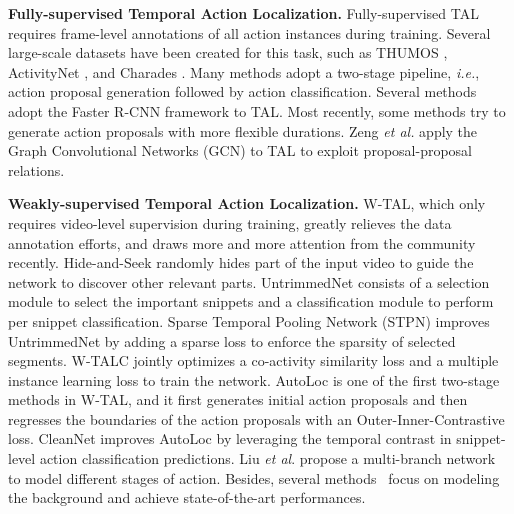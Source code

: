 \documentclass[runningheads]{llncs}
\begin{document}
\noindent\textbf{Fully-supervised Temporal Action Localization.} Fully-supervised TAL requires frame-level annotations of all action instances during training. Several large-scale datasets have been created for this task, such as THUMOS \cite{jiang2014thumos,gorban2015thumos}, ActivityNet \cite{caba2015activitynet}, and Charades \cite{sigurdsson2016hollywood}. 
Many methods \cite{shou2017cdc,zhao2017temporal,gao2017cascaded,heilbron2017scc,dai2017temporal,xu2017r,lin2018bsn,chao2018rethinking} adopt a two-stage pipeline, \emph{i.e.}, action proposal generation followed by action classification. 
Several methods \cite{xu2017r,dai2017temporal,gao2017turn,chao2018rethinking} adopt the Faster R-CNN \cite{ren2015faster} framework to TAL.
Most recently, some methods \cite{lin2018bsn,long2019gaussian,lin2019bmn} try to generate action proposals with more flexible durations. 
Zeng \textit{et al.} \cite{zeng2019graph} apply the Graph Convolutional Networks (GCN) \cite{kipf2016semi,tan2015learning} to TAL to exploit proposal-proposal relations.


\noindent\textbf{Weakly-supervised Temporal Action Localization.} W-TAL, which only requires video-level supervision during training, greatly relieves the data annotation efforts, and draws more and more attention from the community recently. Hide-and-Seek \cite{kumar2017hide} randomly hides part of the input video to guide the network to discover other relevant parts.  UntrimmedNet \cite{wang2017untrimmednets} consists of a selection module to select the important snippets and a classification module to perform per snippet classification. Sparse Temporal Pooling Network (STPN) \cite{nguyen2018weakly} improves UntrimmedNet by adding a sparse loss to enforce the sparsity of selected segments. W-TALC \cite{paul2018w} jointly optimizes a co-activity similarity loss and a multiple instance learning loss to train the network. AutoLoc \cite{shou2018autoloc} is one of the first two-stage methods in W-TAL, and it first generates initial action proposals and then regresses the boundaries of the action proposals with an Outer-Inner-Contrastive loss. CleanNet \cite{liu2019weakly} improves AutoLoc by leveraging the temporal contrast in snippet-level action classification predictions.
Liu \textit{et al}. \cite{liu2019completeness} propose a multi-branch network to model different stages of action.
Besides, several methods~\cite{nguyen2019weakly,lee2020background} focus on modeling the background and achieve state-of-the-art performances.
\end{document}
